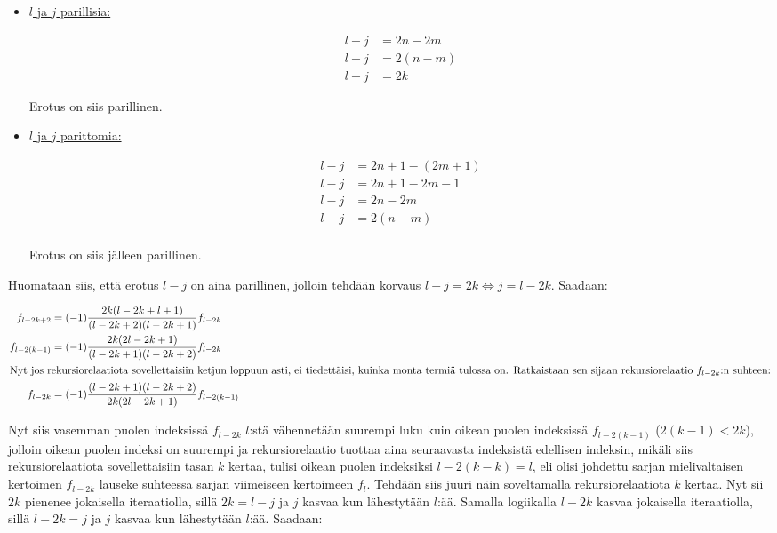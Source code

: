 \documentclass[../johdoksia.tex]{subfiles}
\begin{document}
	\begin{itemize}
		\item \underline{$l$ ja $j$ parillisia:}
		
		\begin{align*}
			l - j &= 2n - 2m \\
			l - j &= 2(n - m) \\
			l - j &= 2k
		\end{align*}
	
		Erotus on siis parillinen.
		
		\item \underline{$l$ ja $j$ parittomia:}
		
		\begin{align*}
			l - j &= 2n + 1 - (2m + 1) \\
			l - j &= 2n + 1 - 2m - 1 \\
			l - j &= 2n - 2m \\
			l - j &= 2(n - m) \\
		\end{align*}
	
		Erotus on siis jälleen parillinen.
	\end{itemize}

	Huomataan siis, että erotus $l - j$ on aina parillinen, jolloin tehdään korvaus $l - j = 2k \iff j = l - 2k$. Saadaan:
	
	\begin{align*}
		f_{l - 2k + 2} &= (-1)\frac{2k(l - 2k + l + 1)}{(l - 2k + 2)(l - 2k + 1)}f_{l - 2k} \\
		f_{l - 2(k - 1)} &= (-1)\frac{2k(2l - 2k + 1)}{(l - 2k + 1)(l - 2k + 2)}f_{l - 2k} \\
		\intertext{Nyt jos rekursiorelaatiota sovellettaisiin ketjun loppuun asti, ei tiedettäisi, kuinka monta termiä tulossa on. Ratkaistaan sen sijaan rekursiorelaatio $f_{l - 2k}$:n suhteen:}
		f_{l - 2k} &= (-1)\frac{(l - 2k + 1)(l - 2k + 2)}{2k(2l - 2k + 1)}f_{l - 2(k - 1)}
	\end{align*}

	\noindent Nyt siis vasemman puolen indeksissä $f_{l - 2k}$ $l$:stä vähennetään suurempi luku kuin oikean puolen indeksissä $f_{l - 2(k - 1)}$ ($2(k - 1) < 2k$), jolloin oikean puolen indeksi on suurempi ja rekursiorelaatio tuottaa aina seuraavasta indeksistä edellisen indeksin, mikäli siis rekursiorelaatiota sovellettaisiin tasan $k$ kertaa, tulisi oikean puolen indeksiksi $l - 2(k - k) = l$, eli olisi johdettu sarjan mielivaltaisen kertoimen $f_{l - 2k}$ lauseke suhteessa sarjan viimeiseen kertoimeen $f_l$. Tehdään siis juuri näin soveltamalla rekursiorelaatiota $k$ kertaa. Nyt sii $2k$ pienenee jokaisella iteraatiolla, sillä $2k = l - j$ ja $j$ kasvaa kun lähestytään $l$:ää. Samalla logiikalla $l - 2k$ kasvaa jokaisella iteraatiolla, sillä $l - 2k = j$ ja $j$ kasvaa kun lähestytään $l$:ää. Saadaan:
	
\end{document}
